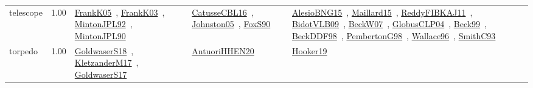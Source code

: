 {\begin{longtable}{p{3cm}r>{\raggedright\arraybackslash}p{6cm}>{\raggedright\arraybackslash}p{6cm}>{\raggedright\arraybackslash}p{8cm}}
\index{telescope}\index{ApplicationAreas!telescope}telescope &  1.00 & \href{../works/FrankK05.pdf}{FrankK05}~\cite{FrankK05}, \href{../works/FrankK03.pdf}{FrankK03}~\cite{FrankK03}, \href{../works/MintonJPL92.pdf}{MintonJPL92}~\cite{MintonJPL92}, \href{../works/MintonJPL90.pdf}{MintonJPL90}~\cite{MintonJPL90} & \href{../works/CatusseCBL16.pdf}{CatusseCBL16}~\cite{CatusseCBL16}, \href{../works/Johnston05.pdf}{Johnston05}~\cite{Johnston05}, \href{../works/FoxS90.pdf}{FoxS90}~\cite{FoxS90} & \href{../works/AlesioBNG15.pdf}{AlesioBNG15}~\cite{AlesioBNG15}, \href{../works/Maillard15.pdf}{Maillard15}~\cite{Maillard15}, \href{../works/ReddyFIBKAJ11.pdf}{ReddyFIBKAJ11}~\cite{ReddyFIBKAJ11}, \href{../works/BidotVLB09.pdf}{BidotVLB09}~\cite{BidotVLB09}, \href{../works/BeckW07.pdf}{BeckW07}~\cite{BeckW07}, \href{../works/GlobusCLP04.pdf}{GlobusCLP04}~\cite{GlobusCLP04}, \href{../works/Beck99.pdf}{Beck99}~\cite{Beck99}, \href{../works/BeckDDF98.pdf}{BeckDDF98}~\cite{BeckDDF98}, \href{../works/PembertonG98.pdf}{PembertonG98}~\cite{PembertonG98}, \href{../works/Wallace96.pdf}{Wallace96}~\cite{Wallace96}, \href{../works/SmithC93.pdf}{SmithC93}~\cite{SmithC93}\\
\index{torpedo}\index{ApplicationAreas!torpedo}torpedo &  1.00 & \href{../works/GoldwaserS18.pdf}{GoldwaserS18}~\cite{GoldwaserS18}, \href{../works/KletzanderM17.pdf}{KletzanderM17}~\cite{KletzanderM17}, \href{../works/GoldwaserS17.pdf}{GoldwaserS17}~\cite{GoldwaserS17} & \href{../works/AntuoriHHEN20.pdf}{AntuoriHHEN20}~\cite{AntuoriHHEN20} & \href{../works/Hooker19.pdf}{Hooker19}~\cite{Hooker19}\\

\end{longtable}}
